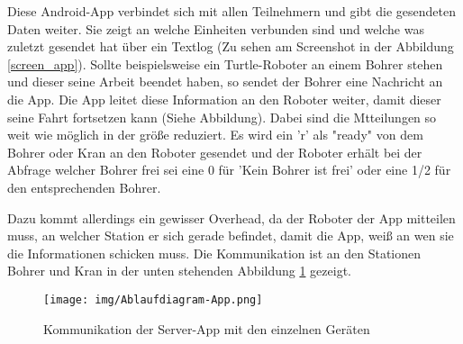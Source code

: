 Diese Android-App verbindet sich mit allen Teilnehmern und gibt die gesendeten Daten weiter. Sie zeigt an welche Einheiten verbunden sind und welche was zuletzt gesendet hat über ein Textlog (Zu sehen am Screenshot in der Abbildung \ref{screen_app}). Sollte beispielsweise ein Turtle-Roboter an einem Bohrer stehen und dieser seine Arbeit beendet haben, so sendet der Bohrer eine Nachricht an die App. Die App leitet diese Information an den Roboter weiter, damit dieser seine Fahrt fortsetzen kann (Siehe Abbildung). Dabei sind die Mtteilungen so weit wie möglich in der größe reduziert. Es wird ein 'r' als "ready" von dem Bohrer oder Kran an den Roboter gesendet und der Roboter erhält bei der Abfrage welcher Bohrer frei sei eine 0 für 'Kein Bohrer ist frei' oder eine 1/2 für den entsprechenden Bohrer.

Dazu kommt allerdings ein gewisser Overhead, da der Roboter der App mitteilen muss, an welcher Station er sich gerade befindet, damit die App, weiß an wen sie die Informationen schicken muss. Die Kommunikation ist an den Stationen Bohrer und Kran in der unten stehenden Abbildung \ref{ablauf_app} gezeigt.
\begin{figure}[h]
\begin{center}
\texttt{[image: img/Ablaufdiagram-App.png]}
\caption{Kommunikation der Server-App mit den einzelnen Geräten} \label{ablauf_app}
\end{center}
\end{figure}